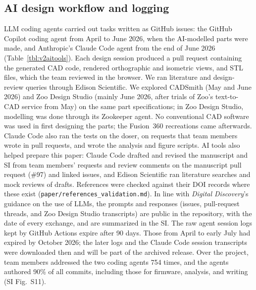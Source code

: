 \documentclass[twoside,twocolumn,9pt]{article}
\begin{document}
\subsection{AI design workflow and logging}
LLM coding agents carried out tasks written as GitHub issues: the GitHub Copilot coding agent from April to June 2026, when the AI-modelled parts were made, and Anthropic's Claude Code agent from the end of June 2026 (Table~\ref{tbl:v2aitools}). Each design session produced a pull request containing the generated CAD code, rendered orthographic and isometric views, and STL files, which the team reviewed in the browser. We ran literature and design-review queries through Edison Scientific. We explored CADSmith (May and June 2026) and Zoo Design Studio (mainly June 2026, after trials of Zoo's text-to-CAD service from May) on the same part specifications; in Zoo Design Studio, modelling was done through its Zookeeper agent. No conventional CAD software was used in first designing the parts; the Fusion~360 recreations came afterwards. Claude Code also ran the tests on the doser, on requests that team members wrote in pull requests, and wrote the analysis and figure scripts. AI tools also helped prepare this paper: Claude Code drafted and revised the manuscript and SI from team members' requests and review comments on the manuscript pull request (\#97) and linked issues, and Edison Scientific ran literature searches and mock reviews of drafts. References were checked against their DOI records where these exist (\texttt{paper/references\_validation.md}). In line with \textit{Digital Discovery}'s guidance on the use of LLMs, the prompts and responses (issues, pull-request threads, and Zoo Design Studio transcripts) are public in the repository, with the date of every exchange, and are summarized in the SI. The raw agent session logs kept by GitHub Actions expire after 90 days. Those from April to early July had expired by October 2026; the later logs and the Claude Code session transcripts were downloaded then and will be part of the archived release. Over the project, team members addressed the two coding agents 754 times, and the agents authored 90\% of all commits, including those for firmware, analysis, and writing (SI Fig.~S11).
\end{document}
